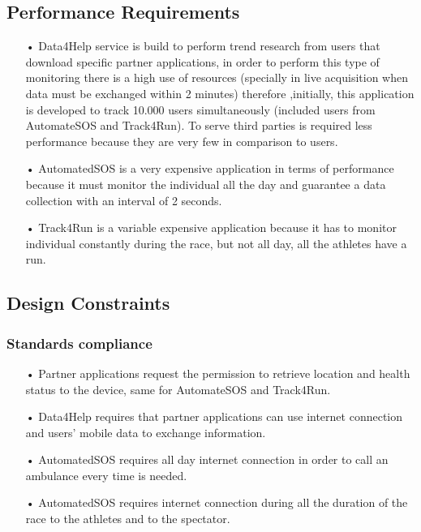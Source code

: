 \subsection{Performance Requirements}
\begin{enumerate} 
\item[•] Data4Help service is build to perform trend research from users that download specific partner applications, in order to perform this type of monitoring there is a high use of resources (specially in live acquisition when data must be exchanged within 2 minutes) therefore ,initially, this application is developed to track 10.000 users simultaneously (included users from AutomateSOS and Track4Run). To serve third parties is required less performance because they are very few in comparison to users.

\item[•] AutomatedSOS is a very expensive application in terms of performance because it must monitor the individual all the day and guarantee a data collection with an interval of 2 seconds.

\item[•] Track4Run is a variable expensive application because it has to monitor individual constantly during the race, but not all day, all the athletes have a run.
\end{enumerate}

\subsection{Design Constraints}
\subsubsection{Standards compliance}
\begin{enumerate} 
\item[•] Partner applications request the permission to retrieve location and health status to the device, same for AutomateSOS and Track4Run.
\item[•] Data4Help requires that partner applications can use internet connection and users' mobile data to exchange information.
\item[•] AutomatedSOS requires all day internet connection in order to call an ambulance every time is needed.
\item[•] AutomatedSOS requires internet connection during all the duration of the race to the athletes and to the spectator.
\end{enumerate}

